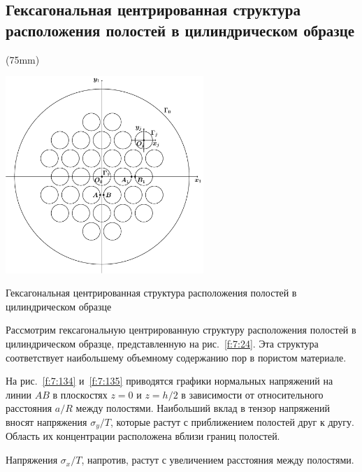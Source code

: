 \subsection{Гексагональная центрированная структура расположения полостей в цилиндрическом образце}

\sidefig(75mm){
\includegraphics[width=7.5cm]{hexagonal-centroid.pdf}
\caption{Гексагональная центрированная структура расположения полостей в цилиндрическом образце}
\label{f:7:24}
}{Рассмотрим гексагональную центрированную структуру расположения полостей в цилиндрическом образце, представленную на рис.~\ref{f:7:24}. Эта структура соответствует наибольшему объемному содержанию пор в пористом материале.

На рис.~\ref{f:7:134} и~\ref{f:7:135} приводятся графики нормальных напряжений на линии $AB$ в плоскостях $z=0$ и $z=h/2$ в зависимости от относительного расстояния $a/R$ между полостями. Наибольший вклад в тензор напряжений вносят напряжения $\sigma_y/T$, которые растут с приближением полостей друг к другу. Область их концентрации расположена вблизи границ полостей.} 

Напряжения $\sigma_x/T$, напротив, растут с увеличением расстояния между полостями.

